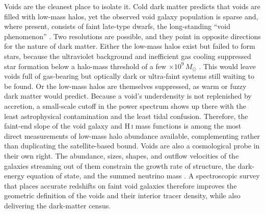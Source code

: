 \documentclass[10pt,onecolumn]{article}
\begin{document}
Voids are the cleanest place to isolate it. Cold dark matter predicts that voids are filled with low-mass halos, yet the observed void galaxy population is sparse and, where present, consists of faint late-type dwarfs, the long-standing ``void phenomenon'' \cite{peebles2001}. Two resolutions are possible, and they point in opposite directions for the nature of dark matter. Either the low-mass halos exist but failed to form stars, because the ultraviolet background and inefficient gas cooling suppressed star formation below a halo-mass threshold of a few $\times10^{9}\,M_\odot$ \cite{hoeft2010}. This would leave voids full of gas-bearing but optically dark or ultra-faint systems still waiting to be found. Or the low-mass halos are themselves suppressed, as warm or fuzzy dark matter would predict. Because a void's underdensity is not replenished by accretion, a small-scale cutoff in the power spectrum shows up there with the least astrophysical contamination and the least tidal confusion. Therefore, the faint-end slope of the void galaxy and H\,\textsc{i} mass functions is among the most direct measurements of low-mass halo abundance available, complementing rather than duplicating the satellite-based bound. Voids are also a cosmological probe in their own right. The abundance, sizes, shapes, and outflow velocities of the galaxies streaming out of them constrain the growth rate of structure, the dark-energy equation of state, and the summed neutrino mass \cite{hamaus2016}. A spectroscopic survey that places accurate redshifts on faint void galaxies therefore improves the geometric definition of the voids and their interior tracer density, while also delivering the dark-matter census.
\end{document}
